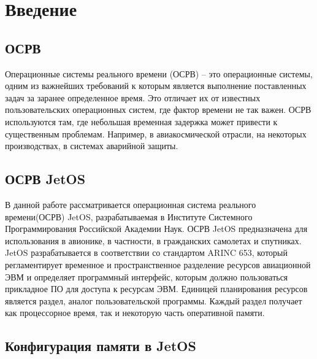 \documentclass[oneside,senior,etd]{BYUPhys}
\begin{document}
\fixmargins
 \makepreliminarypages

\oneandhalfspace

\newenvironment{compactlist}{
  \begin{list}{{$\bullet$}}{
  \setlength\partopsep{0pt}
  \setlength\parskip{0pt}
  \setlength\parsep{10pt}
  \setlength\topsep{8pt}
  \setlength\itemsep{0pt}
  }
  }{
  \end{list}
}

\tableofcontents

\section{Введение}

\subsection{ОСРВ}

Операционные системы реального времени (ОСРВ) -- это операционные системы, одним из важнейших
требований к которым является выполнение поставленных задач за заранее определенное время.
Это отличает их от известных пользовательских операционных систем, где фактор времени не так
важен. ОСРВ используются там, где небольшая временная задержка может привести к существенным
проблемам. Например, в авиакосмической отрасли, на некоторых производствах, в системах
аварийной защиты.

\subsection{ОСРВ JetOS}

В данной работе рассматривается операционная система реального времени(ОСРВ) JetOS, разрабатываемая
в Институте Системного Программирования Российской Академии Наук. ОСРВ JetOS предназначена для
использования в авионике, в частности, в гражданских самолетах и спутниках. JetOS разрабатывается
в соответствии со стандартом ARINC 653, который регламентирует временное и пространственное
разделение ресурсов авиационной ЭВМ и определяет программный интерфейс, которым должно
пользоваться прикладное ПО для доступа к ресурсам ЭВМ. Единицей планирования ресурсов является
раздел, аналог пользовательской программы. Каждый раздел получает как процессорное время, 
так и некоторую часть оперативной памяти.

\subsection{Конфигурация памяти в JetOS}
\end{document}
